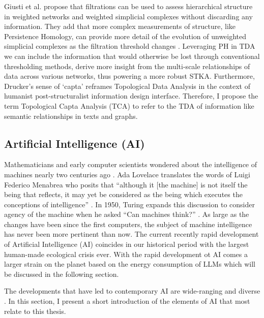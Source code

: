 Giusti et al. propose that filtrations can be used to assess hierarchical structure in weighted networks and weighted simplicial complexes without discarding any information. They add that more complex measurements of structure, like Persistence Homology, can provide more detail of the evolution of unweighted simplicial complexes as the filtration threshold changes \citep[p. 11]{giusti_twos_2016}. Leveraging PH in TDA we can include the information that would otherwise be lost through conventional thresholding methods, derive more insight from the multi-scale relationships of data across various networks, thus powering a more robust STKA. Furthermore, Drucker's sense of `capta' \citep[p. 131]{drucker_graphesis_2014} reframes Topological Data Analysis in the context of humanist post-structuralist information design interface. Therefore, I propose the term Topological Capta Analysis (TCA) to refer to the TDA of information like semantic relationships in texts and graphs. 



\subsection{Artificial Intelligence (AI)}
Mathematicians and early computer scientists wondered about the intelligence of machines nearly two centuries ago \citep{lovelace_notes_1842}. Ada Lovelace translates the words of Luigi Federico Menabrea who posits that “although it [the machine] is not itself the being that reflects, it may yet be considered as the being which executes the conceptions of intelligence” \citep{lovelace_notes_1842}. In 1950, Turing expands this discussion to consider agency of the machine when he asked “Can machines think?” \citep[p. 433] {turing_computing_1950-1}. As large as the changes have been since the first computers, the subject of machine intelligence has never been more pertinent than now. The current recently rapid development of Artificial Intelligence (AI) coincides in our historical period with the largest human-made ecological crisis ever. With the rapid development ot AI comes a larger strain on the planet based on the energy consumption of LLMs which will be discussed in the following section. 
 

The developments that have led to contemporary AI are wide-ranging and diverse \citep{bergmann_what_2024,tunstall_natural_2022,vaswani_attention_2017,goodfellow_deep_2016,mikolov_efficient_2013}. In this section, I present a short introduction of the elements of AI that most relate to this thesis. 

